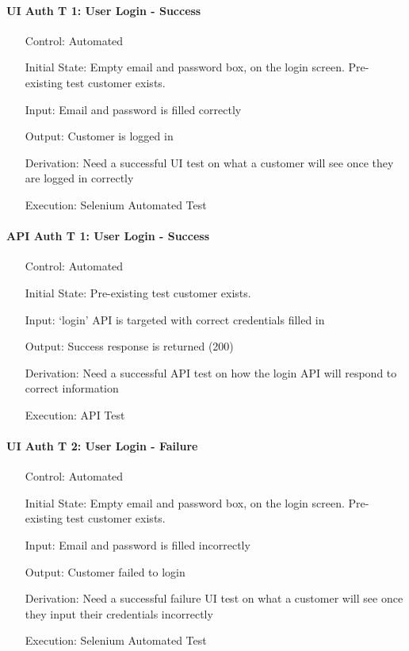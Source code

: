 \documentclass[12pt, titlepage]{article}
\begin{document}
\paragraph*{UI Auth T 1: User Login - Success}
\begin{itemize}
	\item[Control:] Automated
	\item[Initial State:] Empty email and password box, on the login screen. Pre-existing test customer exists. 
	\item[Input:] Email and password is filled correctly
	\item[Output:] Customer is logged in
	\item[Derivation:] Need a successful UI test on what a customer will see once they are logged in correctly
	\item[Execution:] Selenium Automated Test
\end{itemize}

\paragraph*{API Auth T 1: User Login - Success}
\begin{itemize}
	\item[Control:] Automated
	\item[Initial State:] Pre-existing test customer exists. 
	\item[Input:] `login' API is targeted with correct credentials filled in
	\item[Output:] Success response is returned (200)
	\item[Derivation:] Need a successful API test on how the login API will respond to correct information
	\item[Execution:] API Test
\end{itemize}

\paragraph*{UI Auth T 2: User Login - Failure}
\begin{itemize}
	\item[Control:] Automated
	\item[Initial State:] Empty email and password box, on the login screen. Pre-existing test customer exists. 
	\item[Input:] Email and password is filled incorrectly
	\item[Output:] Customer failed to login
	\item[Derivation:] Need a successful failure UI test on what a customer will see once they input their credentials incorrectly
	\item[Execution:] Selenium Automated Test
\end{itemize}
\end{document}
